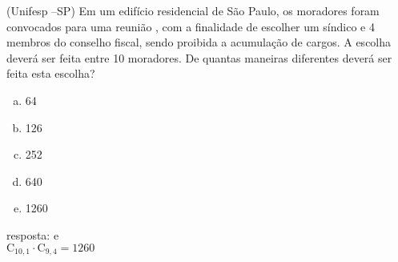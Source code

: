 \begin{ex}
(Unifesp –SP) Em um edifício residencial de São Paulo, os moradores foram convocados para uma reunião , com a finalidade de escolher um síndico e 4 membros do conselho fiscal, sendo proibida a acumulação de cargos. A escolha deverá ser feita entre 10 moradores. De quantas maneiras diferentes deverá ser feita esta escolha?
   \begin{enumerate}[(a)]
   \item 64
   \item 126
   \item 252
   \item 640
   \item 1260
   \end{enumerate}
     \begin{sol}
        resposta: e \\
      $\mathrm{C}_{{10},1}\cdot\mathrm{C}_{9,4}=1260$
     \end{sol}
\end{ex}